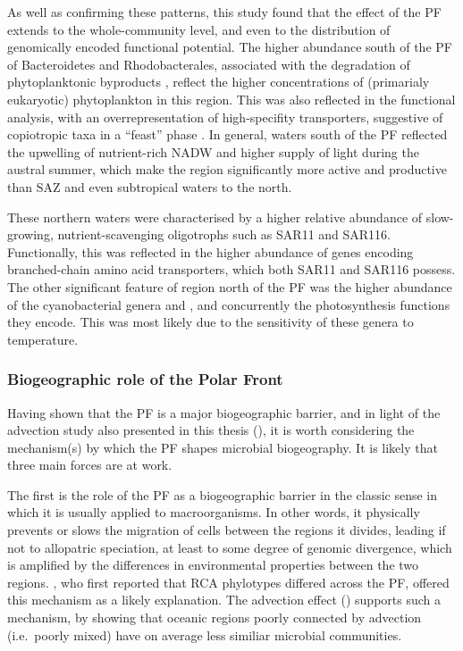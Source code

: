 As well as confirming these patterns, this study found that the effect of the \ac{PF} extends to the whole-community level, and even to the distribution of genomically encoded functional potential.
The higher abundance south of the \ac{PF} of Bacteroidetes and Rhodobacterales, associated with the degradation of phytoplanktonic byproducts \citep[e.g.][]{Buchan:2005hd,Williams:2012gsa}, reflect the higher concentrations of (primarialy eukaryotic) phytoplankton in this region. 
This was also reflected in the functional analysis, with an overrepresentation of high-specifity transporters, suggestive of copiotropic taxa in a ``feast'' phase \cite{Lauro:2009gx}.
In general, waters south of the \ac{PF} reflected the upwelling of nutrient-rich \ac{NADW} and higher supply of light during the austral summer, which make the region significantly more active and productive than \ac{SAZ} and even subtropical waters to the north.

These northern waters were characterised by a higher relative abundance of slow-growing, nutrient-scavenging oligotrophs such as SAR11 and SAR116.
Functionally, this was reflected in the higher abundance of genes encoding branched-chain amino acid transporters, which both SAR11 and SAR116 possess.
The other significant feature of region north of the \ac{PF} was the higher abundance of the cyanobacterial genera  and , and concurrently the photosynthesis functions they encode.
This was most likely due to the sensitivity of these genera to temperature.

\subsubsection{Biogeographic role of the Polar Front}

Having shown that the \ac{PF} is a major biogeographic barrier, and in light of the advection study also presented in this thesis (), it is worth considering the mechanism(s) by which the \ac{PF} shapes microbial biogeography.
It is likely that three main forces are at work.

The first is the role of the \ac{PF} as a biogeographic barrier in the classic sense in which it is usually applied to macroorganisms.
In other words, it physically prevents or slows the migration of cells between the regions it divides, leading if not to allopatric speciation, at least to some degree of genomic divergence, which is amplified by the differences in environmental properties between the two regions.
\citet{Selje:2004ka}, who first reported that \ac{RCA} phylotypes differed across the \ac{PF}, offered this mechanism as a likely explanation.
The advection effect () supports such a mechanism, by showing that oceanic regions poorly connected by advection (i.e.\ poorly mixed) have on average less similiar microbial communities.


